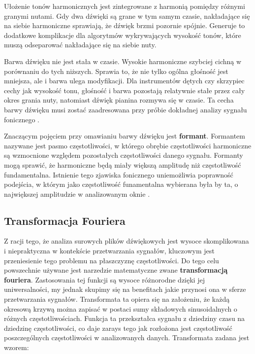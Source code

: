 \documentclass[12pt,a4paper,twoside]{mwart}
\begin{document}
Ułożenie tonów harmonicznych jest zintegrowane z harmonią pomiędzy różnymi granymi nutami. Gdy dwa dźwięki są grane w tym samym czasie, nakładające się na siebie harmoniczne sprawiają, że dźwięk brzmi pozornie spójnie. Generuje to dodatkowe komplikacje dla algorytmów wykrywających wysokość tonów, które muszą odseparować nakładające się na siebie nuty.

Barwa dźwięku nie jest stała w czasie. Wysokie harmoniczne szybciej cichną w porównaniu do tych niższych. Sprawia to, że nie tylko ogólna głośność jest mniejsza, ale i barwa ulega modyfikacji. Dla instrumentów dętych czy skrzypiec cechy jak wysokość tonu, głośność i barwa pozostają relatywnie stałe przez cały okres grania nuty, natomiast dźwięk pianina rozmywa się w czasie. Ta cecha barwy dźwięku musi zostać zaadresowana przy próbie dokładnej analizy sygnału fonicznego \cite[64-65]{Homerecording:DlaKazdego}.

Znaczącym pojęciem przy omawianiu barwy dźwięku jest \textbf{formant}. Formantem nazywane jest pasmo częstotliwości, w którego obrębie częstotliwości harmoniczne są wzmocnione względem pozostałych częstotliwości danego sygnału. Formanty mogą sprawić, że harmoniczne będą miały większą amplitudę niż częstotliwość fundamentalna. Istnienie tego zjawiska fonicznego uniemożliwia poprawność podejścia, w którym jako częstotliwość funamentalna wybierana była by ta, o największej amplitudzie w analizowanym oknie \cite[62-63]{BarwaDzwieku:Formant}.

\subsection{Transformacja Fouriera}\label{sec:TF}
Z racji tego, że analiza surowych plików dźwiękowych jest wysoce skomplikowana i niepraktyczna w kontekście przetwarzania sygnałów, kluczowym jest przeniesienie tego problemu na płaszczyznę częstotliwości. Do tego celu powszechnie używane jest narzedzie matematyczne zwane \textbf{transformacją fouriera}. Zastosowania tej funkcji są wysoce różnorodne dzięki jej uniwersalności, my jednak skupimy się na benefitach jakie przynosi ona w sferze przetwarzania sygnałów. Transformata ta opiera się na założeniu, że każdą okresową krzywą można zapisać w postaci sumy składowych sinusoidalnych o różnych częstotliwościach. Funkcja ta przekształca sygnału z dziedziny czasu na dziedzinę częstotliwości, co daje zarays tego jak rozłożona jest częstotliwość poszczególnych częstotliwości w analizowanych danych. Transformata zadana jest wzorem:
\end{document}
